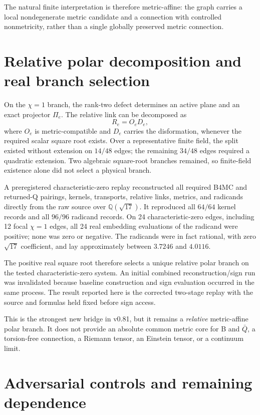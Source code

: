 \documentclass[12pt,a4paper,twoside]{article}
\newcommand{\Qsqrt}{\mathbb{Q}(\sqrt{17})}
\begin{document}
The natural finite interpretation is therefore metric-affine: the graph carries a local nondegenerate metric candidate and a connection with controlled nonmetricity, rather than a single globally preserved metric connection.

\section{Relative polar decomposition and real branch selection}

On the $\chi=1$ branch, the rank-two defect determines an active plane and an exact projector $\Pi_e$. The relative link can be decomposed as
\begin{equation}
R_e=O_eD_e,
\label{eq:polar}
\end{equation}
where $O_e$ is metric-compatible and $D_e$ carries the disformation, whenever the required scalar square root exists. Over a representative finite field, the split existed without extension on $14/48$ edges; the remaining $34/48$ edges required a quadratic extension. Two algebraic square-root branches remained, so finite-field existence alone did not select a physical branch.

A preregistered characteristic-zero replay reconstructed all required B4MC and returned-Q pairings, kernels, transports, relative links, metrics, and radicands directly from the raw source over $\Qsqrt$. It reproduced all $64/64$ kernel records and all $96/96$ radicand records. On 24 characteristic-zero edges, including 12 focal $\chi=1$ edges, all 24 real embedding evaluations of the radicand were positive; none was zero or negative. The radicands were in fact rational, with zero $\sqrt{17}$ coefficient, and lay approximately between $3.7246$ and $4.0116$.

The positive real square root therefore selects a unique relative polar branch on the tested characteristic-zero system. An initial combined reconstruction/sign run was invalidated because baseline construction and sign evaluation occurred in the same process. The result reported here is the corrected two-stage replay with the source and formulas held fixed before sign access.

This is the strongest new bridge in v0.81, but it remains a \emph{relative} metric-affine polar branch. It does not provide an absolute common metric core for B and $\bar Q$, a torsion-free connection, a Riemann tensor, an Einstein tensor, or a continuum limit.

\section{Adversarial controls and remaining dependence}
\end{document}
